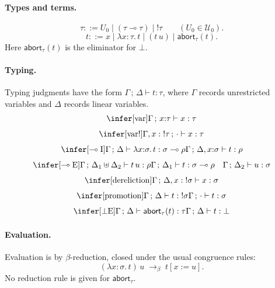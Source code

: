 \paragraph{Types and terms.}
\[
\tau ::= U_0 \mid (\tau \multimap \tau) \mid {!}\tau
\qquad (U_0 \in \mathcal{U}_0).
\]
\[
t ::= x \mid \lambda x{:}\tau.\, t \mid (t\,u) \mid \mathsf{abort}_{\tau}(t).
\]
Here $\mathsf{abort}_{\tau}(t)$ is the eliminator for $\bot$.

\paragraph{Typing.}
Typing judgments have the form $\Gamma \,;\, \Delta \vdash t : \tau$, where $\Gamma$ records unrestricted variables and $\Delta$ records linear variables.
\[
\begin{gathered}
\infer[\mathrm{var}]
      {\Gamma \,;\, x{:}\tau \vdash x : \tau}{} \\[4pt]
\infer[\mathrm{var}!]
      {\Gamma, x:{!}\tau \,;\, \cdot \vdash x : \tau}{}
\end{gathered}
\]
\[
\begin{gathered}
\infer[\multimap\mathrm{I}]
      {\Gamma \,;\, \Delta \vdash \lambda x{:}\sigma.\, t : \sigma \multimap \rho}
      {\Gamma \,;\, \Delta, x{:}\sigma \vdash t : \rho} \\[4pt]
\infer[\multimap\mathrm{E}]
      {\Gamma \,;\, \Delta_1 \uplus \Delta_2 \vdash t\,u : \rho}
      {\Gamma \,;\, \Delta_1 \vdash t : \sigma \multimap \rho
       \quad
       \Gamma \,;\, \Delta_2 \vdash u : \sigma}
\end{gathered}
\]
\[
\begin{gathered}
\infer[\mathrm{dereliction}]
      {\Gamma \,;\, \Delta, x:{!}\sigma \vdash x : \sigma}{} \\[4pt]
\infer[\mathrm{promotion}]
      {\Gamma \,;\, \Delta \vdash t : {!}\sigma}
      {\Gamma \,;\, \cdot \vdash t : \sigma} \\[4pt]
\infer[\bot\mathrm{E}]
      {\Gamma \,;\, \Delta \vdash \mathsf{abort}_{\tau}(t) : \tau}
      {\Gamma \,;\, \Delta \vdash t : \bot}
\end{gathered}
\]

\paragraph{Evaluation.}
Evaluation is by $\beta$-reduction, closed under the usual congruence rules:
\[
(\lambda x{:}\sigma.\, t)\,u \;\to_\beta\; t[x:=u].
\]
No reduction rule is given for $\mathsf{abort}_{\tau}$.

